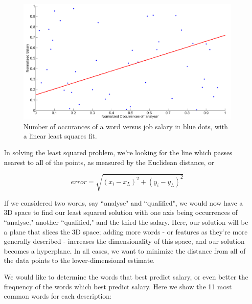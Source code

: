 \documentclass[12pt]{article}
\begin{document}
    \begin{figure}
        \begin{center}
        
            \includegraphics[width=\linewidth]{figLSE}

            \caption{\label{fig:lse} Number of occurances of a word versus job
            salary in blue dots, with a linear least squares fit.}

        \end{center}
    \end{figure}
    
    In solving the least squared problem, we're looking for the line which
    passes nearest to all of the points, as measured by the Euclidean distance,
    or

    \begin{equation}
    error = \sqrt{ (x_i - x_L)^2 + (y_i - y_L)^2} 
    \end{equation}
 
    If we considered two words, say ``analyse" and ``qualified", we would now
    have a 3D space to find our least squared solution with one axis being
    occurrences of ``analyse," another ``qualified," and the third the salary.
    Here, our solution will be a plane that slices the 3D space; adding more
    words - or features as they're more generally described - increases the
    dimensionality of this space, and our solution becomes a hyperplane.  In
    all cases, we want to minimize the distance from all of the data points to
    the lower-dimensional estimate.
    
    We would like to determine the words that best predict salary, or even
    better the frequency of the words which best predict salary. Here we show
    the 11 most common words for each description:
\end{document}
